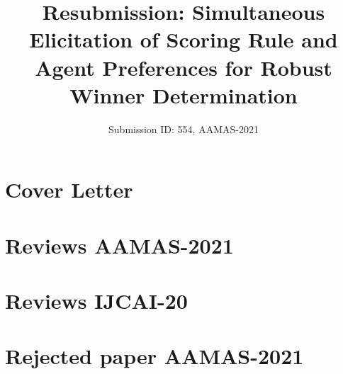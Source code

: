 \documentclass[version=3.21, pagesize, twoside=off, bibliography=totoc, DIV=calc, fontsize=12pt, a4paper]{scrartcl}
\title{Resubmission: Simultaneous Elicitation of Scoring Rule and Agent Preferences for Robust Winner Determination}
\author{Submission ID: 554, AAMAS-2021}
\date{}
\begin{document}
\maketitle

\section{Cover Letter}


\section{Reviews AAMAS-2021}


\section{Reviews IJCAI-20}


\section{Rejected paper AAMAS-2021}
%

%
\end{document}
